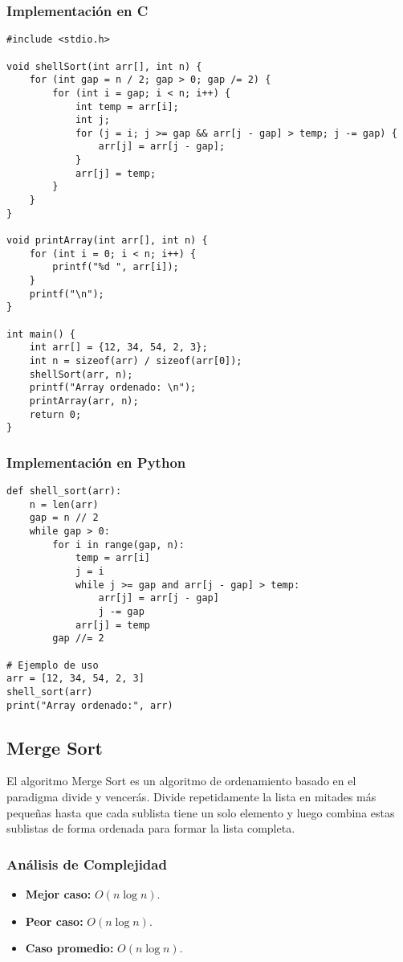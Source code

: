 \documentclass[11pt,openany]{book}
\begin{document}
\subsubsection{Implementación en C}
\lstset{language=C}
\begin{lstlisting}
#include <stdio.h>

void shellSort(int arr[], int n) {
    for (int gap = n / 2; gap > 0; gap /= 2) {
        for (int i = gap; i < n; i++) {
            int temp = arr[i];
            int j;
            for (j = i; j >= gap && arr[j - gap] > temp; j -= gap) {
                arr[j] = arr[j - gap];
            }
            arr[j] = temp;
        }
    }
}

void printArray(int arr[], int n) {
    for (int i = 0; i < n; i++) {
        printf("%d ", arr[i]);
    }
    printf("\n");
}

int main() {
    int arr[] = {12, 34, 54, 2, 3};
    int n = sizeof(arr) / sizeof(arr[0]);
    shellSort(arr, n);
    printf("Array ordenado: \n");
    printArray(arr, n);
    return 0;
}
\end{lstlisting}

\subsubsection{Implementación en Python}
\lstset{language=Python}
\begin{lstlisting}
def shell_sort(arr):
    n = len(arr)
    gap = n // 2
    while gap > 0:
        for i in range(gap, n):
            temp = arr[i]
            j = i
            while j >= gap and arr[j - gap] > temp:
                arr[j] = arr[j - gap]
                j -= gap
            arr[j] = temp
        gap //= 2

# Ejemplo de uso
arr = [12, 34, 54, 2, 3]
shell_sort(arr)
print("Array ordenado:", arr)
\end{lstlisting}


\subsection{Merge Sort}
El algoritmo Merge Sort es un algoritmo de ordenamiento basado en el paradigma divide y vencerás. Divide repetidamente la lista en mitades más pequeñas hasta que cada sublista tiene un solo elemento y luego combina estas sublistas de forma ordenada para formar la lista completa.

\subsubsection{Análisis de Complejidad}
\begin{itemize}
    \item \textbf{Mejor caso:} $O(n \log n)$.
    \item \textbf{Peor caso:} $O(n \log n)$.
    \item \textbf{Caso promedio:} $O(n \log n)$.
\end{itemize}
\end{document}
